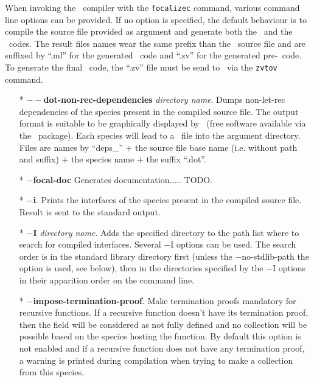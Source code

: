 \label{compiler-options}
When invoking the \focal\ compiler with the {\tt focalizec} command,
various command line options can be provided. If no option is
specified, the default behaviour is to compile the source file
provided as argument and generate both the \ocaml\ and the
\coq\ codes. The result files names wear the same prefix than the
\focal\ source file and are suffixed by ``.ml'' for the generated
\ocaml\ code and ``.zv'' for the generated pre-\coq\ code.
To generate the final \coq\ code, the ``.zv'' file must be send to
\zenon\ via the {\tt zvtov} command.

\begin{itemize}
  \item[*] {\bf $--$dot-non-rec-dependencies} {\em directory name}.
    Dumps non-let-rec dependencies of the species present in the
    compiled source file. The output format is suitable to be
    graphically displayed by \dotty\ (free software available via the
    \graphviz\ package). Each species will lead to a \dotty\ file into
    the argument directory. Files are names by ``deps\_'' + the source
    file base name (i.e. without path and suffix) + the species name +
    the suffix ``.dot''.

  \item[*] {\bf $-$focal-doc} Generates documentation..... TODO.

  \item[*] {\bf $-$i}. Prints the interfaces of the species present in
    the compiled source file. Result is sent to the standard output.

  \item[*] {\bf $-$I} {\em directory name}. Adds the specified
    directory to the path list where to search for compiled
    interfaces. Several $-$I options can be used. The search order is
    in the standard library directory first (unless the
    $-$no-stdlib-path the option is used, see below), then in the
    directories specified by the $-$I options in their apparition
    order on the command line.

  \item[*] {\bf $-$impose-termination-proof}. Make termination proofs
    mandatory for recursive functions. If a recursive function doesn't
    have its termination proof, then the field will be considered as
    not fully defined and no collection will be possible based on the
    species hosting the function. By default this option is not
    enabled and if a recursive function does not have any termination
    proof, a warning is printed during compilation when trying to make
    a collection from this species.


\end{itemize}

